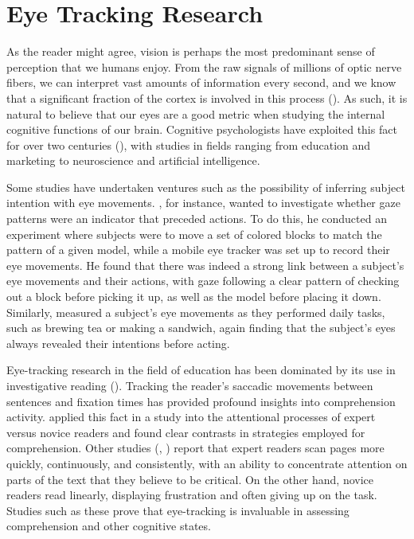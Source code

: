 \section{Eye Tracking Research}

As the reader might agree, vision is perhaps the most predominant sense of perception that we humans enjoy. From the raw signals of millions of optic nerve fibers, we can interpret vast amounts of information every second, and we know that a significant fraction of the cortex is involved in this process (\cite{klatzky2012}). As such, it is natural to believe that our eyes are a good metric when studying the internal cognitive functions of our brain. Cognitive psychologists have exploited this fact for over two centuries (\cite{eckstein2017}), with studies in fields ranging from education and marketing to neuroscience and artificial intelligence.

Some studies have undertaken ventures such as the possibility of inferring subject intention with eye movements. \cite{ballard1992}, for instance, wanted to investigate whether gaze patterns were an indicator that preceded actions. To do this, he conducted an experiment where subjects were to move a set of colored blocks to match the pattern of a given model, while a mobile eye tracker was set up to record their eye movements. He found that there was indeed a strong link between a subject's eye movements and their actions, with gaze following a clear pattern of checking out a block before picking it up, as well as the model before placing it down. Similarly, \cite{land1999} measured a subject's eye movements as they performed daily tasks, such as brewing tea or making a sandwich, again finding that the subject's eyes always revealed their intentions before acting.


Eye-tracking research in the field of education has been dominated by its use in investigative reading (\cite{knight2014}). Tracking the reader's saccadic movements between sentences and fixation times has provided profound insights into comprehension activity. \cite{vangog2009} applied this fact in a study into the attentional processes of expert versus novice readers and found clear contrasts in strategies employed for comprehension. Other studies (\cite{rayner1998}, \cite{rayner2008}) report that expert readers scan pages more quickly, continuously, and consistently, with an ability to concentrate attention on parts of the text that they believe to be critical. On the other hand, novice readers read linearly, displaying frustration and often giving up on the task. Studies such as these prove that eye-tracking is invaluable in assessing comprehension and other cognitive states.